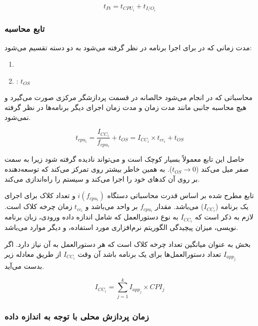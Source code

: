 \documentclass[a4paper]{article}
\begin{document}
\begin{equation}
    t_{Pi} = t_{CPU_i} + t_{I/O_i}
\end{equation}

\subsubsection{تابع محاسبه }

مدت زمانی که در  برای اجرا برنامه در نظر گرفته می‌شود به دو دسته تقسیم می‌شود:

\begin{enumerate}
    \item {}
    \item {}: $t_{OS}$
\end{enumerate}

محاسباتی که در  انجام می‌شود خالصانه در قسمت پردازشگر مرکزی صورت
می‌گیرد و هیچ محاسبه جانبی مانند مدت زمان  و مدت زمان اجرای دیگر
برنامه‌ها در نظر گرفته نمی‌شود.

\begin{equation}
    t_{cpu_i} = \frac{I_{CC_i}}{f_{cpu_i}} + t_{OS} = I_{CC_i} \times t_{cc_i} + t_{OS}
\end{equation}

حاصل این تابع معمولاً بسیار کوچک است و می‌تواند نادیده گرفته شود زیرا به سمت صفر
میل می‌کند ($t_{OS} \rightarrow 0$). به همین خاطر بیشتر روی 
تمرکز می‌کند که توسعه‌دهنده بر روی آن کد‌های خود را اجرا می‌کند و سیستم 
را راه‌اندازی می‌کند.

تابع مطرح شده بر اساس قدرت محاسباتی دستگاه $i(f_{cpu_i})$ و تعداد کلاک 
برای اجرای یک برنامه ($I_{CC_i}$) می‌باشد. مقدار $f_{cpu_i}$ بر واحد 
می‌باشد و $t_{cc_i}$ زمان چرخه کلاک است. لازم به ذکر است که $I_{CC_i}$ به نوع
دستورالعمل که شامل اندازه داده ورودی، زبان برنامه نویسی، میزان پیچیدگی الگوریتم
نرم‌افزاری مورد استفاده، و دیگر موارد می‌باشد.

بخش  به عنوان میانگین تعداد چرخه کلاک است
که هر دستورالعمل به آن نیاز دارد. اگر $I_{app_j}$ تعداد دستورالعمل‌ها برای یک
برنامه باشد آن وقت $I_{CC_i}$ از طریق معادله زیر بدست می‌آید.

\begin{equation}
    I_{CC_i} = \sum_{j=1}^{k} I_{app_j} \times CPI_{j}
\end{equation}

\subsubsection{زمان پردازش محلی با توجه به اندازه داده }
\end{document}
